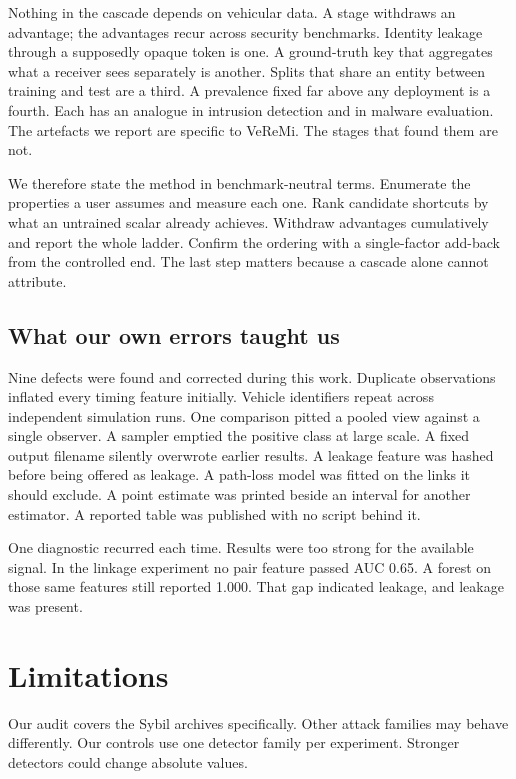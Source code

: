\documentclass[conference]{IEEEtran}
\begin{document}
Nothing in the cascade depends on vehicular data.
A stage withdraws an advantage; the advantages recur across security benchmarks.
Identity leakage through a supposedly opaque token is one.
A ground-truth key that aggregates what a receiver sees separately is another.
Splits that share an entity between training and test are a third.
A prevalence fixed far above any deployment is a fourth.
Each has an analogue in intrusion detection and in malware evaluation.
The artefacts we report are specific to VeReMi.
The stages that found them are not.

We therefore state the method in benchmark-neutral terms.
Enumerate the properties a user assumes and measure each one.
Rank candidate shortcuts by what an untrained scalar already achieves.
Withdraw advantages cumulatively and report the whole ladder.
Confirm the ordering with a single-factor add-back from the controlled end.
The last step matters because a cascade alone cannot attribute.

\subsection{What our own errors taught us}

Nine defects were found and corrected during this work.
Duplicate observations inflated every timing feature initially.
Vehicle identifiers repeat across independent simulation runs.
One comparison pitted a pooled view against a single observer.
A sampler emptied the positive class at large scale.
A fixed output filename silently overwrote earlier results.
A leakage feature was hashed before being offered as leakage.
A path-loss model was fitted on the links it should exclude.
A point estimate was printed beside an interval for another estimator.
A reported table was published with no script behind it.

One diagnostic recurred each time.
Results were too strong for the available signal.
In the linkage experiment no pair feature passed AUC 0.65.
A forest on those same features still reported 1.000.
That gap indicated leakage, and leakage was present.

\section{Limitations}

Our audit covers the Sybil archives specifically.
Other attack families may behave differently.
Our controls use one detector family per experiment.
Stronger detectors could change absolute values.
\end{document}
